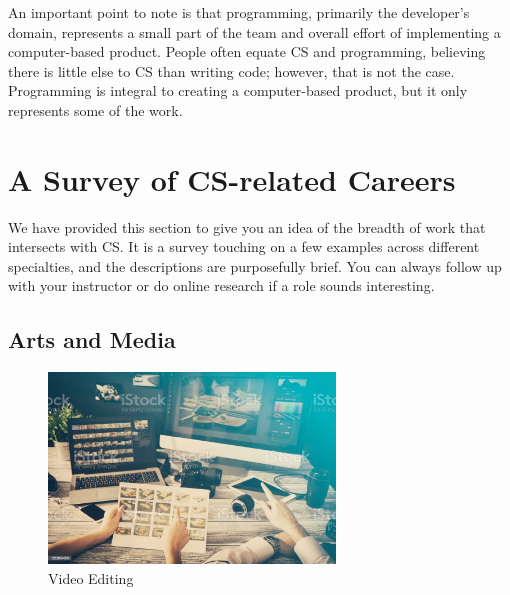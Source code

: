 An important point to note is that programming, primarily the developer's domain, represents a small part of the team and overall effort of implementing a computer-based product. People often equate CS and programming, believing there is little else to CS than writing code; however, that is not the case. Programming is integral to creating a computer-based product, but it only represents some of the work.


\newpage

\section{A Survey of CS-related Careers}

We have provided this section to give you an idea of the breadth of work that intersects with CS. It is a survey touching on a few examples across different specialties, and the descriptions are purposefully brief. You can always follow up with your instructor or do online research if a role sounds interesting.

\subsection{Arts and Media}

\begin{figure}[H]
	\begin{center}
		\caption{Video Editing}
		\vskip 4pt
		\includegraphics[height=2in]{images/careers/istockphoto-922654000-1024x1024.jpg}
	\end{center}
\end{figure}

